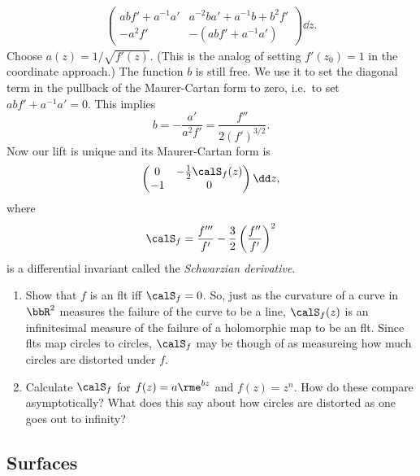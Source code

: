\begin{example}
\begin{multline}
\begin{pmatrix}
            abf'+a^{-1}a' & a^{-2}ba'+a^{-1}b+b^2f' \\
            -a^2f' & -(abf'+a^{-1}a')
        \end{pmatrix}\dd z.
    \end{multline}
    Choose $a(z)=1/\sqrt{f'(z)}$. (This is the analog of setting $f'(z_0)=1$ in the coordinate approach.) The function $b$ is still free. We use it to set the diagonal term in the pullback of the Maurer-Cartan form to zero, i.e.\ to set $abf'+a^{-1}a'=0$. This implies 
    \[b=-\frac{a'}{a^2f'}=\frac{f''}{2(f')^{3/2}}.\]
    Now our lift is unique and its Maurer-Cartan form is 
    \[
        \begin{pmatrix}
            0 & -\frac12 \calS_f(z)\\
            -1 & 0
        \end{pmatrix}\dd z,
        \]
    where 
    \[\calS_f=\frac{f'''}{f'}-\frac32\left(\frac{f''}{f'}\right)^2\]
    is a differential invariant called the \emph{Schwarzian derivative}.
\end{example}

\begin{xca}
    \begin{enumerate}
        \item Show that $f$ is an \gls{flt} iff $\calS_f=0$. So, just as the curvature of a curve in $\bbR^2$ measures the failure of the curve to be a line, $\calS_f(z)$ is an infinitesimal measure of the failure of a holomorphic map to be an \gls{flt}. Since \glspl{flt} map circles to circles, $\calS_f$ may be though of as measureing how much circles are distorted under $f$.
        \item Calculate $\calS_f$ for $f(z)=a\rme^{bz}$ and $f(z)=z^n$. How do these compare asymptotically? What does this say about how circles are distorted as one goes out to infinity?
    \end{enumerate}
\end{xca}









\subsection{Surfaces}\label{sec: theory of surfaces}

